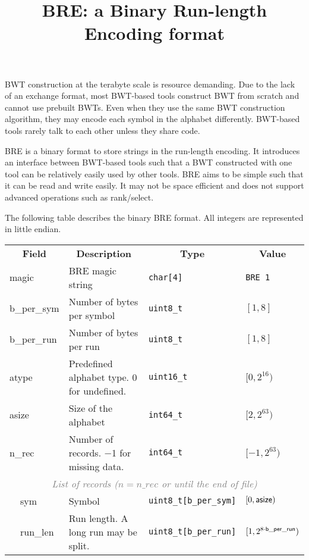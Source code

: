 \documentclass[10pt]{article}
\title{BRE: a Binary Run-length Encoding format}
\author{}
\date{\vspace{-8ex}}
\begin{document}
\maketitle

{\small
BWT construction at the terabyte scale is resource demanding.
Due to the lack of an exchange format, most BWT-based tools construct BWT from scratch and cannot use prebuilt BWTs.
Even when they use the same BWT construction algorithm, they may encode each symbol in the alphabet differently.
BWT-based tools rarely talk to each other unless they share code.

BRE is a binary format to store strings in the run-length encoding.
It introduces an interface between BWT-based tools such that a BWT constructed with one tool can be relatively easily used by other tools.
BRE aims to be simple such that it can be read and write easily.
It may not be space efficient and does not support advanced operations such as rank/select.

The following table describes the binary BRE format.
All integers are represented in little endian.
}
\begin{table}[ht]
\centering
{\small
\begin{tabular}{|l|l|p{7.0cm}|l|l|}
  \cline{1-5}
  \multicolumn{2}{|c|}{\bf Field} & \multicolumn{1}{c|}{\bf Description} & \multicolumn{1}{c|}{\bf Type} & \multicolumn{1}{c|}{\bf Value} \\\cline{1-5}
  \multicolumn{2}{|l|}{\sf magic} & BRE magic string & {\tt char[4]} & {\tt BRE\char92 1}\\\cline{1-5}
  \multicolumn{2}{|l|}{\sf b\_per\_sym} & Number of bytes per symbol & {\tt uint8\_t} & $[1,8]$ \\\cline{1-5}
  \multicolumn{2}{|l|}{\sf b\_per\_run} & Number of bytes per run & {\tt uint8\_t} & $[1,8]$ \\\cline{1-5}
  \multicolumn{2}{|l|}{\sf atype} & Predefined alphabet type. 0 for undefined. & {\tt uint16\_t} & $[0,2^{16})$ \\\cline{1-5}
  \multicolumn{2}{|l|}{\sf asize} & Size of the alphabet & {\tt int64\_t} & $[2,2^{63})$ \\\cline{1-5}
  \multicolumn{2}{|l|}{\sf n\_rec} & Number of records. $-$1 for missing data. & {\tt int64\_t} & $[-1,2^{63})$ \\\cline{1-5}
  \multicolumn{5}{|c|}{\textcolor{gray}{\it List of records ($n=n\_rec$ or until the end of file)}} \\\cline{2-5}
  & {\sf sym} & Symbol & {\tt uint8\_t[b\_per\_sym]} & $[0,{\sf asize})$ \\\cline{2-5}
  & {\sf run\_len} & Run length. A long run may be split. & {\tt uint8\_t[b\_per\_run]} & $[1,2^{8\cdot{\sf b\_per\_run}})$ \\\cline{2-5}
  \cline{1-5}
\end{tabular}}
\end{table}
\end{document}
